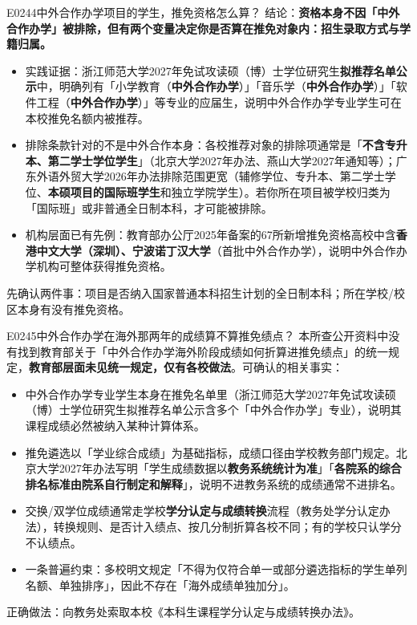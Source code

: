\begin{qa}{E0244}{中外合作办学项目的学生，推免资格怎么算？}
结论：\textbf{资格本身不因「中外合作办学」被排除，但有两个变量决定你是否算在推免对象内：招生录取方式与学籍归属。}
\begin{itemize}
  \item 实践证据：浙江师范大学2027年免试攻读硕（博）士学位研究生\textbf{拟推荐名单公示}中，明确列有「小学教育（\textbf{中外合作办学}）」「音乐学（\textbf{中外合作办学}）」「软件工程（\textbf{中外合作办学}）」等专业的应届生，说明中外合作办学专业学生可在本校推免名额内被推荐。
  \item 排除条款针对的不是中外合作本身：各校推荐对象的排除项通常是「\textbf{不含专升本、第二学士学位学生}」（北京大学2027年办法、燕山大学2027年通知等）；广东外语外贸大学2026年办法排除范围更宽（辅修学位、专升本、第二学士学位、\textbf{本硕项目的国际班学生}和独立学院学生）。若你所在项目被学校归类为「国际班」或非普通全日制本科，才可能被排除。
  \item 机构层面已有先例：教育部办公厅2025年备案的67所新增推免资格高校中含\textbf{香港中文大学（深圳）、宁波诺丁汉大学}（首批中外合作办学），说明中外合作办学机构可整体获得推免资格。
\end{itemize}
先确认两件事：项目是否纳入国家普通本科招生计划的全日制本科；所在学校/校区本身有没有推免资格。
\end{qa}

\begin{qa}{E0245}{中外合作办学在海外那两年的成绩算不算推免绩点？}
本所查公开资料中没有找到教育部关于「中外合作办学海外阶段成绩如何折算进推免绩点」的统一规定，\textbf{教育部层面未见统一规定，仅有各校做法}。可确认的相关事实：
\begin{itemize}
  \item 中外合作办学专业学生本身在推免名单里（浙江师范大学2027年免试攻读硕（博）士学位研究生拟推荐名单公示含多个「中外合作办学」专业），说明其课程成绩必然被纳入某种计算体系。
  \item 推免遴选以「学业综合成绩」为基础指标，成绩口径由学校教务部门规定。北京大学2027年办法写明「学生成绩数据以\textbf{教务系统统计为准}」「\textbf{各院系的综合排名标准由院系自行制定和解释}」，说明不进教务系统的成绩通常不进排名。
  \item 交换/双学位成绩通常走学校\textbf{学分认定与成绩转换}流程（教务处学分认定办法），转换规则、是否计入绩点、按几分制折算各校不同；有的学校只认学分不认绩点。
  \item 一条普遍约束：多校明文规定「不得为仅符合单一或部分遴选指标的学生单列名额、单独排序」，因此不存在「海外成绩单独加分」。
\end{itemize}
正确做法：向教务处索取本校《本科生课程学分认定与成绩转换办法》。
\end{qa}

